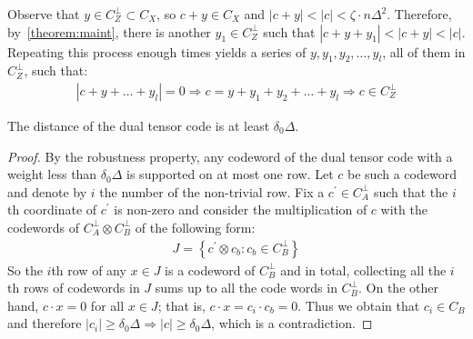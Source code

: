 Observe that $y \in C_{Z}^{\perp} \subset C_{X}$, so $c + y \in C_{X}$ and $|c + y| < |c| < \zeta \cdot n \Delta^{2}$. Therefore, by~\cref{theorem:maint}, there is another $y_{1} \in C_{Z}^{\perp}$ such that $|c + y + y_{1}| < |c + y| < |c|$. Repeating this process enough times yields a series of $y, y_{1}, y_{2}, \dots, y_{l}$, all of them in $C_{Z}^{\perp}$, such that:
\begin{equation*}
  \begin{split}
    |c + y + \dots + y_{l}| = 0 \Rightarrow c = y + y_{1} + y_{2} + \dots + y_{l} \Rightarrow c \in C_{Z}^{\perp}
  \end{split}
\end{equation*}

\begin{claim}
  The distance of the dual tensor code is at least $\delta_{0}\Delta$.
  \label{claim:duweight}
\end{claim}
\begin{proof}
By the robustness property, any codeword of the dual tensor code with a weight less than $\delta_{0}\Delta$ is supported on at most one row. Let $c$ be such a codeword and denote by $i$ the number of the non-trivial row. Fix a $c^{\prime} \in C_{A}^{\perp}$ such that the $i$th coordinate of  $c^{\prime}$ is non-zero and consider the multiplication of $c$ with the codewords of $C_{A}^\perp \otimes C_{B}^\perp$ of the following form:
  \begin{equation*}
    \begin{split}
      J = \left\{ c^{\prime} \otimes c_{b} : c_{b}\in C_{B}^{\perp} \right\} 
    \end{split}
  \end{equation*}
  So the $i$th row of any $x \in J$ is a codeword of $C_{B}^{\perp}$ and in total, collecting all the $i$th rows of codewords in $J$ sums up to all the code words in $C_{B}^{\perp}$. On the other hand, $c\cdot x = 0$ for all $x \in J$; that is, $c\cdot x = c_{i} \cdot c_{b} = 0$. Thus we obtain that $c_{i} \in C_{B}$ and therefore $|c_{i}| \ge \delta_{0}\Delta \Rightarrow |c| \ge \delta_{0}\Delta$, which is a contradiction.
\end{proof}

